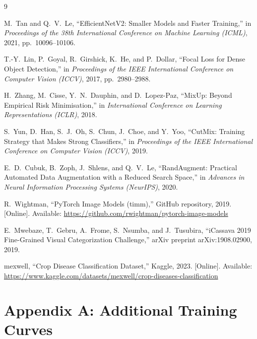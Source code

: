 \documentclass[12pt,a4paper]{article}
\begin{document}
\begin{thebibliography}{9}

M.\ Tan and Q.\ V.\ Le, ``EfficientNetV2: Smaller Models and Faster Training,'' in \textit{Proceedings of the 38th International Conference on Machine Learning (ICML)}, 2021, pp.\ 10096--10106.

T.-Y.\ Lin, P.\ Goyal, R.\ Girshick, K.\ He, and P.\ Dollar, ``Focal Loss for Dense Object Detection,'' in \textit{Proceedings of the IEEE International Conference on Computer Vision (ICCV)}, 2017, pp.\ 2980--2988.

H.\ Zhang, M.\ Cisse, Y.\ N.\ Dauphin, and D.\ Lopez-Paz, ``MixUp: Beyond Empirical Risk Minimisation,'' in \textit{International Conference on Learning Representations (ICLR)}, 2018.

S.\ Yun, D.\ Han, S.\ J.\ Oh, S.\ Chun, J.\ Choe, and Y.\ Yoo, ``CutMix: Training Strategy that Makes Strong Classifiers,'' in \textit{Proceedings of the IEEE International Conference on Computer Vision (ICCV)}, 2019.

E.\ D.\ Cubuk, B.\ Zoph, J.\ Shlens, and Q.\ V.\ Le, ``RandAugment: Practical Automated Data Augmentation with a Reduced Search Space,'' in \textit{Advances in Neural Information Processing Systems (NeurIPS)}, 2020.

R.\ Wightman, ``PyTorch Image Models (timm),'' GitHub repository, 2019. [Online]. Available: \url{https://github.com/rwightman/pytorch-image-models}

E.\ Mwebaze, T.\ Gebru, A.\ Frome, S.\ Nsumba, and J.\ Tusubira, ``iCassava 2019 Fine-Grained Visual Categorization Challenge,'' arXiv preprint arXiv:1908.02900, 2019.

mexwell, ``Crop Disease Classification Dataset,'' Kaggle, 2023. [Online]. Available: \url{https://www.kaggle.com/datasets/mexwell/crop-diseases-classification}

\end{thebibliography}

\newpage
\appendix
\section*{Appendix A: Additional Training Curves}
\end{document}
